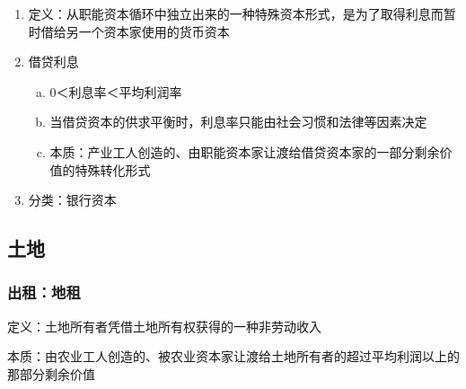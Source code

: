 \documentclass[12pt]{book}
\begin{document}
\begin{enumerate}[1.]
\begin{enumerate}[(1)]
              \item 定义：从职能资本循环中独立出来的一种特殊资本形式，是为了取得利息而暂时借给另一个资本家使用的货币资本
              \item 借贷利息
                    \begin{enumerate}[a.]
                        \item 0＜利息率＜平均利润率
                        \item 当借贷资本的供求平衡时，利息率只能由社会习惯和法律等因素决定
                        \item 本质：产业工人创造的、由职能资本家让渡给借贷资本家的一部分剩余价值的特殊转化形式
                    \end{enumerate}
              \item 分类：银行资本
          \end{enumerate}
\end{enumerate}
























\subsection{土地}




\subsubsection{出租：地租}

\par 定义：土地所有者凭借土地所有权获得的一种非劳动收入
\par 本质：由农业工人创造的、被农业资本家让渡给土地所有者的超过平均利润以上的那部分剩余价值
\end{document}
